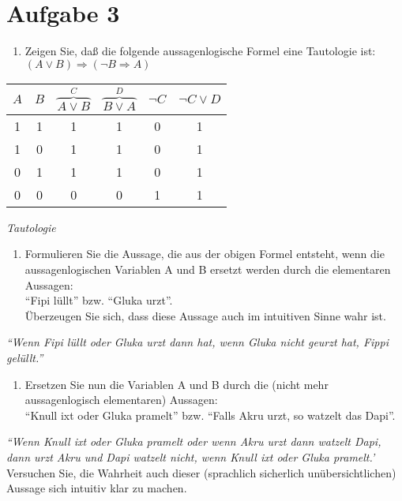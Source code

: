 \section*{Aufgabe 3}

\begin{enumerate}[label={a)}, leftmargin=*]
\item Zeigen Sie, daß die folgende aussagenlogische Formel eine Tautologie ist:\\
$(A \lor B) \Rightarrow (\lnot B \Rightarrow A)$
\end{enumerate}

\begin{table}[h]
\centering
\begin{tabular}{c|c|c|c|c|c}
$A$ & $B$ & $\overbrace{A \lor B}^{C}$ & $\overbrace{B \lor A}^{D}$ & $\lnot C$ & $\lnot C \lor D$\\
\hline
1 & 1 & 1 & 1 & 0 & 1\\
1 & 0 & 1 & 1 & 0 & 1\\
0 & 1 & 1 & 1 & 0 & 1\\
0 & 0 & 0 & 0 & 1 & 1\\
\end{tabular}
\end{table}

\textit{Tautologie}

\begin{enumerate}[label={b)}, leftmargin=*]
\item Formulieren Sie die Aussage, die aus der obigen Formel entsteht, wenn die aussagenlogischen Variablen A und B ersetzt werden durch die elementaren Aussagen:\\
    ``Fipi lüllt'' bzw. ``Gluka urzt''.\\
    Überzeugen Sie sich, dass diese Aussage auch im intuitiven Sinne wahr ist.
\end{enumerate}

\textit{``Wenn Fipi lüllt oder Gluka urzt dann hat, wenn Gluka nicht geurzt hat, Fippi gelüllt.''}

\begin{enumerate}[label={c)}, leftmargin=*]
\item Ersetzen Sie nun die Variablen A und B durch die (nicht mehr aussagenlogisch elementaren)
Aussagen:\\
``Knull ixt oder Gluka pramelt'' bzw. ``Falls Akru urzt, so watzelt das Dapi''.
\end{enumerate}

\textit{``Wenn Knull ixt oder Gluka pramelt oder wenn Akru urzt dann watzelt Dapi, dann urzt Akru und Dapi watzelt nicht, wenn Knull ixt oder Gluka pramelt.'}\\

Versuchen Sie, die Wahrheit auch dieser (sprachlich sicherlich unübersichtlichen) Aussage sich intuitiv klar zu machen.